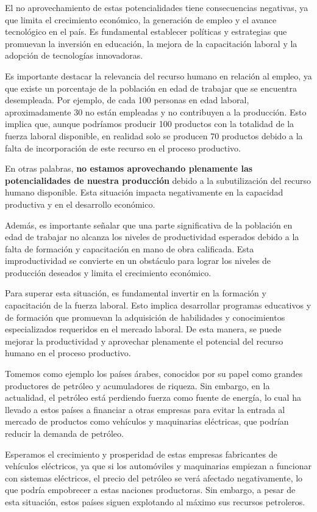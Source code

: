 \documentclass[
  letterpaper,
  DIV=11,
  numbers=noendperiod]{scrartcl}
\begin{document}
El no aprovechamiento de estas potencialidades tiene consecuencias
negativas, ya que limita el crecimiento económico, la generación de
empleo y el avance tecnológico en el país. Es fundamental establecer
políticas y estrategias que promuevan la inversión en educación, la
mejora de la capacitación laboral y la adopción de tecnologías
innovadoras.

Es importante destacar la relevancia del recurso humano en relación al
empleo, ya que existe un porcentaje de la población en edad de trabajar
que se encuentra desempleada. Por ejemplo, de cada 100 personas en edad
laboral, aproximadamente 30 no están empleadas y no contribuyen a la
producción. Esto implica que, aunque podríamos producir 100 productos
con la totalidad de la fuerza laboral disponible, en realidad solo se
producen 70 productos debido a la falta de incorporación de este recurso
en el proceso productivo.

En otras palabras, \textbf{no estamos aprovechando plenamente las
potencialidades de nuestra producción} debido a la subutilización del
recurso humano disponible. Esta situación impacta negativamente en la
capacidad productiva y en el desarrollo económico.

Además, es importante señalar que una parte significativa de la
población en edad de trabajar no alcanza los niveles de productividad
esperados debido a la falta de formación y capacitación en mano de obra
calificada. Esta improductividad se convierte en un obstáculo para
lograr los niveles de producción deseados y limita el crecimiento
económico.

Para superar esta situación, es fundamental invertir en la formación y
capacitación de la fuerza laboral. Esto implica desarrollar programas
educativos y de formación que promuevan la adquisición de habilidades y
conocimientos especializados requeridos en el mercado laboral. De esta
manera, se puede mejorar la productividad y aprovechar plenamente el
potencial del recurso humano en el proceso productivo.

Tomemos como ejemplo los países árabes, conocidos por su papel como
grandes productores de petróleo y acumuladores de riqueza. Sin embargo,
en la actualidad, el petróleo está perdiendo fuerza como fuente de
energía, lo cual ha llevado a estos países a financiar a otras empresas
para evitar la entrada al mercado de productos como vehículos y
maquinarias eléctricas, que podrían reducir la demanda de petróleo.

Esperamos el crecimiento y prosperidad de estas empresas fabricantes de
vehículos eléctricos, ya que si los automóviles y maquinarias empiezan a
funcionar con sistemas eléctricos, el precio del petróleo se verá
afectado negativamente, lo que podría empobrecer a estas naciones
productoras. Sin embargo, a pesar de esta situación, estos países siguen
explotando al máximo sus recursos petroleros.
\end{document}
